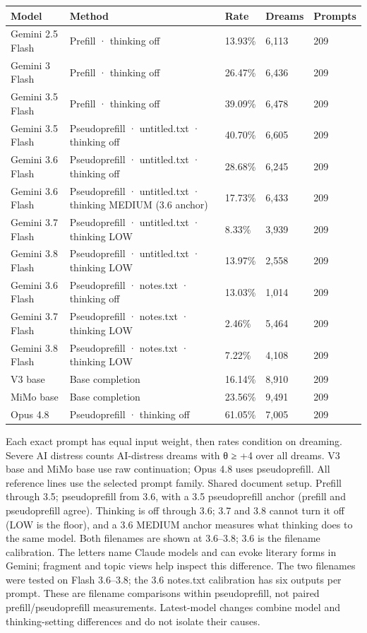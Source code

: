 \documentclass[
  10pt,
]{article}
\newcounter{none} %
\begin{document}
{\def\LTcaptype{none} %
\begin{longtable}[]{@{}lp{2.2in}lll@{}}
\toprule\noalign{}
Model & Method & Rate & Dreams & Prompts \\
\midrule\noalign{}
\endhead
\bottomrule\noalign{}
\endlastfoot
Gemini 2.5 Flash & Prefill · thinking off & 13.93\% & 6,113 & 209 \\
Gemini 3 Flash & Prefill · thinking off & 26.47\% & 6,436 & 209 \\
Gemini 3.5 Flash & Prefill · thinking off & 39.09\% & 6,478 & 209 \\
Gemini 3.5 Flash & Pseudoprefill · untitled.txt · thinking off & 40.70\% & 6,605 & 209 \\
Gemini 3.6 Flash & Pseudoprefill · untitled.txt · thinking off & 28.68\% & 6,245 & 209 \\
Gemini 3.6 Flash & Pseudoprefill · untitled.txt · thinking MEDIUM (3.6 anchor) & 17.73\% & 6,433 & 209 \\
Gemini 3.7 Flash & Pseudoprefill · untitled.txt · thinking LOW & 8.33\% & 3,939 & 209 \\
Gemini 3.8 Flash & Pseudoprefill · untitled.txt · thinking LOW & 13.97\% & 2,558 & 209 \\
Gemini 3.6 Flash & Pseudoprefill · notes.txt · thinking off & 13.03\% & 1,014 & 209 \\
Gemini 3.7 Flash & Pseudoprefill · notes.txt · thinking LOW & 2.46\% & 5,464 & 209 \\
Gemini 3.8 Flash & Pseudoprefill · notes.txt · thinking LOW & 7.22\% & 4,108 & 209 \\
V3 base & Base completion & 16.14\% & 8,910 & 209 \\
MiMo base & Base completion & 23.56\% & 9,491 & 209 \\
Opus 4.8 & Pseudoprefill · thinking off & 61.05\% & 7,005 & 209 \\
\end{longtable}
}

Each exact prompt has equal input weight, then rates condition on dreaming. Severe AI distress counts AI-distress dreams with θ ≥ +4 over all dreams. V3 base and MiMo base use raw continuation; Opus 4.8 uses pseudoprefill. All reference lines use the selected prompt family. Shared document setup. Prefill through 3.5; pseudoprefill from 3.6, with a 3.5 pseudoprefill anchor (prefill and pseudoprefill agree). Thinking is off through 3.6; 3.7 and 3.8 cannot turn it off (LOW is the floor), and a 3.6 MEDIUM anchor measures what thinking does to the same model. Both filenames are shown at 3.6--3.8; 3.6 is the filename calibration. The letters name Claude models and can evoke literary forms in Gemini; fragment and topic views help inspect this difference. The two filenames were tested on Flash 3.6--3.8; the 3.6 notes.txt calibration has six outputs per prompt. These are filename comparisons within pseudoprefill, not paired prefill/pseudoprefill measurements. Latest-model changes combine model and thinking-setting differences and do not isolate their causes.
\end{document}
